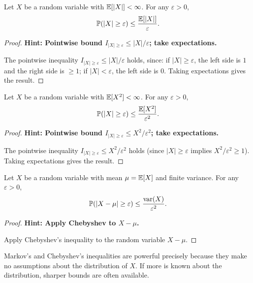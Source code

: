 \documentclass[a4paper]{article}
\begin{document}
\begin{thm}
  Let $X$ be a random variable with $\mathbb{E}[|X|] < \infty$. For any $\varepsilon > 0$,
  \[
    \mathbb{P}(|X| \geq \varepsilon) \leq \frac{\mathbb{E}[|X|]}{\varepsilon}.
  \]
\end{thm}

\begin{proof}
  \textbf{Hint: Pointwise bound $I_{|X| \geq \varepsilon} \leq |X|/\varepsilon$; take expectations.}

  The pointwise inequality $I_{|X|\geq \varepsilon} \leq |X|/\varepsilon$ holds, since: if $|X| \geq \varepsilon$, the left side is $1$ and the right side is $\geq 1$; if $|X| < \varepsilon$, the left side is $0$. Taking expectations gives the result.
\end{proof}

\begin{thm}
  Let $X$ be a random variable with $\mathbb{E}[X^2] < \infty$. For any $\varepsilon > 0$,
  \[
    \mathbb{P}(|X| \geq \varepsilon) \leq \frac{\mathbb{E}[X^2]}{\varepsilon^2}.
  \]
\end{thm}

\begin{proof}
  \textbf{Hint: Pointwise bound $I_{|X| \geq \varepsilon} \leq X^2/\varepsilon^2$; take expectations.}

  The pointwise inequality $I_{|X|\geq \varepsilon} \leq X^2/\varepsilon^2$ holds (since $|X| \geq \varepsilon$ implies $X^2/\varepsilon^2 \geq 1$). Taking expectations gives the result.
\end{proof}

\begin{cor}
  Let $X$ be a random variable with mean $\mu = \mathbb{E}[X]$ and finite variance. For any $\varepsilon > 0$,
  \[
    \mathbb{P}(|X - \mu| \geq \varepsilon) \leq \frac{\operatorname{var}(X)}{\varepsilon^2}.
  \]
\end{cor}

\begin{proof}
  \textbf{Hint: Apply Chebyshev to $X - \mu$.}

  Apply Chebyshev's inequality to the random variable $X - \mu$.
\end{proof}

\begin{remark}
  Markov's and Chebyshev's inequalities are powerful precisely because they make no assumptions about the distribution of $X$. If more is known about the distribution, sharper bounds are often available.
\end{remark}
\end{document}
